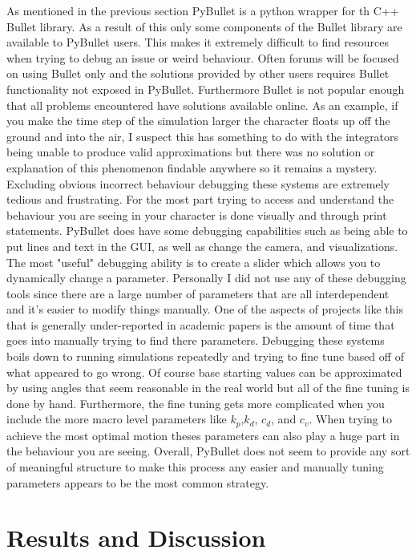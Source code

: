 \documentclass[12pt, a4paper]{article}
\begin{document}
As mentioned in the previous section PyBullet is a python wrapper for th C++ Bullet library. As a result of this only some components of the Bullet library are available to PyBullet users. This makes it extremely difficult to find resources when trying to debug an issue or weird behaviour. Often forums will be focused on using Bullet only and the solutions provided by other users requires Bullet functionality not exposed in PyBullet. Furthermore Bullet is not popular enough that all problems encountered have solutions available online. As an example, if you make the time step of the simulation larger the character floats up off the ground and into the air, I suspect this has something to do with the integrators being unable to produce valid approximations but there was no solution or explanation of this phenomenon findable anywhere so it remains a mystery. Excluding obvious incorrect behaviour debugging these systems are extremely tedious and frustrating. For the most part trying to access and understand the behaviour you are seeing in your character is done visually and through print statements. PyBullet does have some debugging capabilities such as being able to put lines and text in the GUI, as well as change the camera, and visualizations. The most "useful" debugging ability is to create a slider which allows you to dynamically change a parameter. Personally I did not use any of these debugging tools since there are a large number of parameters that are all interdependent and it's easier to modify things manually. One of the aspects of projects like this that is generally under-reported in academic papers is the amount of time that goes into manually trying to find there parameters. Debugging these systems boils down to running simulations repeatedly and trying to fine tune based off of what appeared to go wrong. Of course base starting values can be approximated by using angles that seem reasonable in the real world but all of the fine tuning is done by hand. Furthermore, the fine tuning gets more complicated when you include the more macro level parameters like $k_p$,$k_d$, $c_d$, and $c_v$. When trying to achieve the most optimal motion theses parameters can also play a huge part in the behaviour you are seeing. Overall, PyBullet does not seem to provide any sort of meaningful structure to make this process any easier and manually tuning parameters appears to be the most common strategy.

\section{Results and Discussion}
\end{document}
